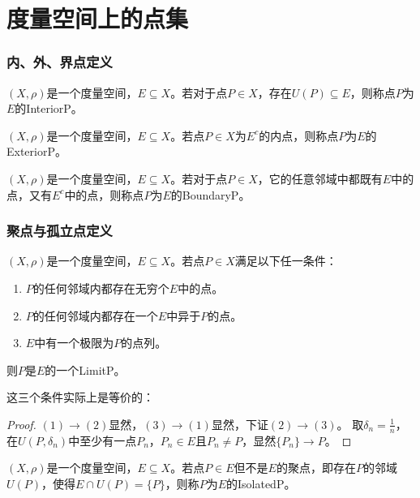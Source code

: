 \section{度量空间上的点集}
\subsubsection{内、外、界点定义}
\begin{definition}
	$(X,\rho)$是一个度量空间，$E\subseteq X$。若对于点$P\in X$，存在$U(P)\subseteq E$，则称点$P$为$E$的\gls{InteriorP}。
\end{definition}
\begin{definition}
	$(X,\rho)$是一个度量空间，$E\subseteq X$。若点$P\in X$为$E^c$的内点，则称点$P$为$E$的\gls{ExteriorP}。
\end{definition}
\begin{definition}
	$(X,\rho)$是一个度量空间，$E\subseteq X$。若对于点$P\in X$，它的任意邻域中都既有$E$中的点，又有$E^c$中的点，则称点$P$为$E$的\gls{BoundaryP}。
\end{definition}
\subsubsection{聚点与孤立点定义}
\begin{definition}
	$(X,\rho)$是一个度量空间，$E\subseteq X$。若点$P\in X$满足以下任一条件：
	\begin{enumerate}
		\item $P$的任何邻域内都存在无穷个$E$中的点。
		\item $P$的任何邻域内都存在一个$E$中异于$P$的点。
		\item $E$中有一个极限为$P$的点列。
	\end{enumerate}
	则$P$是$E$的一个\gls{LimitP}。
\end{definition}
这三个条件实际上是等价的：
\begin{proof}
	$(1)\to(2)$显然，$(3)\to(1)$显然，下证$(2)\to(3)$。
	取$\delta_n=\frac{1}{n}$，在$U(P,\delta_n)$中至少有一点$P_n$，$P_n\in E$且$P_n\ne P$，显然$\{P_n\}\to P$。
\end{proof}
\begin{definition}
	$(X,\rho)$是一个度量空间，$E\subseteq X$。若点$P\in E$但不是$E$的聚点，即存在$P$的邻域$U(P)$，使得$E\cap U(P)=\{P\}$，则称$P$为$E$的\gls{IsolatedP}。
\end{definition}
